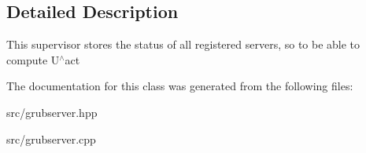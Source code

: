 \subsection{Detailed Description}
This supervisor stores the status of all registered servers, so to be able to compute U$^\wedge$act 

The documentation for this class was generated from the following files\+:\begin{DoxyCompactItemize}
\item 
src/grubserver.\+hpp\item 
src/grubserver.\+cpp\end{DoxyCompactItemize}
